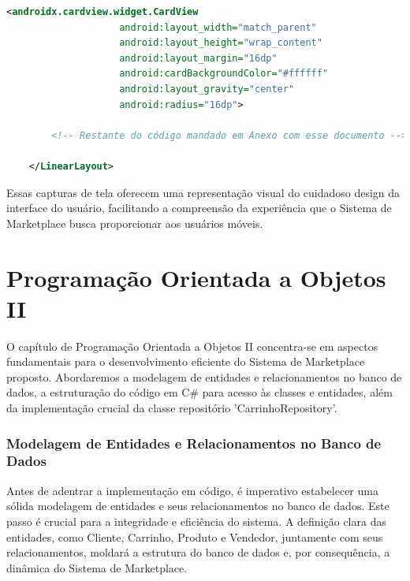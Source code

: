 \documentclass[
	12pt,				%
	openright,			%
	twoside,			%
	a4paper,			%
	english,			%
	brazil				%
	]{abntex2}
\begin{document}
\begin{lstlisting}[language=XML, caption=Exemplo de Código XML, label=lst:xml]
				<androidx.cardview.widget.CardView
					android:layout_width="match_parent"
					android:layout_height="wrap_content"
					android:layout_margin="16dp"
					android:cardBackgroundColor="#ffffff"
					android:layout_gravity="center"
					android:radius="16dp">
	
		<!-- Restante do código mandado em Anexo com esse documento -->
	
	</LinearLayout>

\end{lstlisting}

Essas capturas de tela oferecem uma representação visual do cuidadoso design da interface do usuário, facilitando a compreensão da experiência que o Sistema de Marketplace busca proporcionar aos usuários móveis.

\chapter{Programação Orientada a Objetos II}\label{cap_program_orientada_a_objetos}

O capítulo de Programação Orientada a Objetos II concentra-se em aspectos fundamentais para o desenvolvimento eficiente do Sistema de Marketplace proposto. Abordaremos a modelagem de entidades e relacionamentos no banco de dados, a estruturação do código em C\# para acesso às classes e entidades, além da implementação crucial da classe repositório 'CarrinhoRepository'.

\subsection{Modelagem de Entidades e Relacionamentos no Banco de Dados}

Antes de adentrar a implementação em código, é imperativo estabelecer uma sólida modelagem de entidades e seus relacionamentos no banco de dados. Este passo é crucial para a integridade e eficiência do sistema. A definição clara das entidades, como Cliente, Carrinho, Produto e Vendedor, juntamente com seus relacionamentos, moldará a estrutura do banco de dados e, por consequência, a dinâmica do Sistema de Marketplace.
\end{document}
